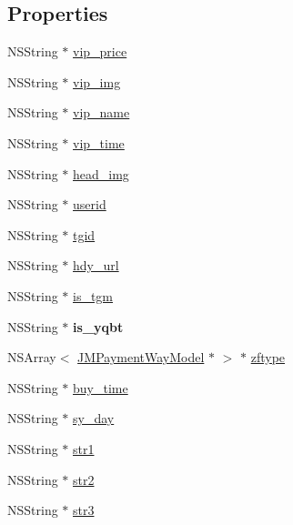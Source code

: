 \subsection*{Properties}
\begin{DoxyCompactItemize}
\item 
N\+S\+String $\ast$ \mbox{\hyperlink{interface_j_m_member_display_model_a5496a1a7f9d8d6142b7b8d93c934022e}{vip\+\_\+price}}
\item 
N\+S\+String $\ast$ \mbox{\hyperlink{interface_j_m_member_display_model_af00ccf0fd9961bcf738aa8417fb00d85}{vip\+\_\+img}}
\item 
N\+S\+String $\ast$ \mbox{\hyperlink{interface_j_m_member_display_model_af8ee13d0c32bf858cdd1f1fbe592ab86}{vip\+\_\+name}}
\item 
N\+S\+String $\ast$ \mbox{\hyperlink{interface_j_m_member_display_model_ac3404a58106fbca2f8194df2a0122a39}{vip\+\_\+time}}
\item 
N\+S\+String $\ast$ \mbox{\hyperlink{interface_j_m_member_display_model_a358589ec293761f0e4d777710d9503bd}{head\+\_\+img}}
\item 
N\+S\+String $\ast$ \mbox{\hyperlink{interface_j_m_member_display_model_a8dc251ec0a67a5251b6c71616dd31e67}{userid}}
\item 
N\+S\+String $\ast$ \mbox{\hyperlink{interface_j_m_member_display_model_a54ef2417e7021aa3395c733e74b0e94e}{tgid}}
\item 
N\+S\+String $\ast$ \mbox{\hyperlink{interface_j_m_member_display_model_a7c1ed3f9d672c42a20152d0519a30d1b}{hdy\+\_\+url}}
\item 
N\+S\+String $\ast$ \mbox{\hyperlink{interface_j_m_member_display_model_aba713fd19e9a8e788ac0b9aa0fcbfee8}{is\+\_\+tgm}}
\item 
\mbox{\label{interface_j_m_member_display_model_a0c00fda3664cf47346b05ba1c681ba8b}} 
N\+S\+String $\ast$ {\bfseries is\+\_\+yqbt}
\item 
N\+S\+Array$<$ \mbox{\hyperlink{interface_j_m_payment_way_model}{J\+M\+Payment\+Way\+Model}} $\ast$ $>$ $\ast$ \mbox{\hyperlink{interface_j_m_member_display_model_aa8721aaf3018c3b57fffc58465cd9d8d}{zftype}}
\item 
N\+S\+String $\ast$ \mbox{\hyperlink{interface_j_m_member_display_model_a02da670580307a4021ef6a806c25684a}{buy\+\_\+time}}
\item 
N\+S\+String $\ast$ \mbox{\hyperlink{interface_j_m_member_display_model_a2430beeb39917f6c9e7ebd7848a6cd52}{sy\+\_\+day}}
\item 
N\+S\+String $\ast$ \mbox{\hyperlink{interface_j_m_member_display_model_a0ed354ea3702500fdf261c90c7b3893e}{str1}}
\item 
N\+S\+String $\ast$ \mbox{\hyperlink{interface_j_m_member_display_model_a78e495f424dd54cb86cd22a983f4c9fe}{str2}}
\item 
N\+S\+String $\ast$ \mbox{\hyperlink{interface_j_m_member_display_model_a6b78e7dfc6890930c6cc712234a37e39}{str3}}
\end{DoxyCompactItemize}


